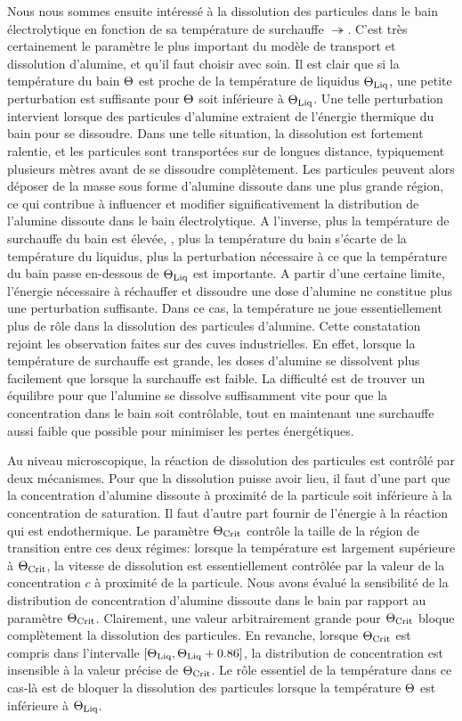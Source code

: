 Nous nous sommes ensuite intéressé à la dissolution des particules
dans le bain électrolytique en fonction de sa température de
surchauffe $\tsur$. C'est très certainement le paramètre le plus
important du modèle de transport et dissolution d'alumine, et qu'il
faut choisir avec soin. Il est clair que si la température du bain
$\Theta$ est proche de la température de liquidus $\Theta_\text{Liq}$, une
petite perturbation est suffisante pour $\Theta$ soit
inférieure à $\Theta_\text{Liq}$. Une telle perturbation intervient lorsque des
particules d'alumine extraient de l'énergie thermique du bain pour
se dissoudre. Dans une telle situation, la dissolution est fortement
ralentie, et les particules sont transportées sur de longues
distance, typiquement plusieurs mètres avant de se dissoudre
complètement. Les particules peuvent alors déposer de la masse sous
forme d'alumine dissoute dans une plus grande région, ce qui contribue
à influencer et modifier significativement la distribution de
l'alumine dissoute dans le bain électrolytique. A l'inverse, plus la
température de surchauffe du bain est élevée, \ie, plus la
température du bain s'écarte de la température du liquidus, plus la
perturbation nécessaire à ce que la température du bain passe
en-dessous de $\Theta_\text{Liq}$ est importante. A partir d'une certaine limite,
l'énergie nécessaire à réchauffer et dissoudre une dose
d'alumine ne constitue plus une perturbation suffisante. Dans ce cas,
la température ne joue essentiellement plus de rôle dans la
dissolution des particules d'alumine. Cette constatation rejoint les
observation faites sur des cuves industrielles. En effet, lorsque la
température de surchauffe est grande, les doses d'alumine se dissolvent
plus facilement que lorsque la surchauffe est faible. La difficulté
est de trouver un équilibre pour que l'alumine se dissolve
suffisamment vite pour que la concentration dans le bain soit
contrôlable, tout en maintenant une surchauffe aussi faible que
possible pour minimiser les pertes énergétiques.

Au niveau microscopique, la réaction de dissolution des particules est
contrôlé par deux mécanismes. Pour que la dissolution puisse avoir
lieu, il faut d'une part que la concentration d'alumine dissoute à
proximité de la particule soit inférieure à la concentration de
saturation. Il faut d'autre part fournir de l'énergie à la réaction
qui est endothermique. Le paramètre $\Theta_\text{Crit}$ contrôle la taille de la
région de transition entre ces deux régimes: lorsque la température
est largement supérieure à $\Theta_\text{Crit}$, la vitesse de dissolution est
essentiellement contrôlée par la valeur de la concentration $c$ à
proximité de la particule. Nous avons évalué la sensibilité de la
distribution de concentration d'alumine dissoute dans le bain par
rapport au paramètre $\Theta_\text{Crit}$. Clairement, une valeur arbitrairement
grande pour $\Theta_\text{Crit}$ bloque complètement la dissolution des
particules. En revanche, lorsque $\Theta_\text{Crit}$ est compris dans
l'intervalle $[\Theta_\text{Liq}, \Theta_\text{Liq} + 0.86]$, la distribution de concentration
est insensible à la valeur précise de $\Theta_\text{Crit}$. Le rôle essentiel de
la température dans ce cas-là est de bloquer la dissolution des
particules lorsque la température $\Theta$ est inférieure à
$\Theta_\text{Liq}$.

